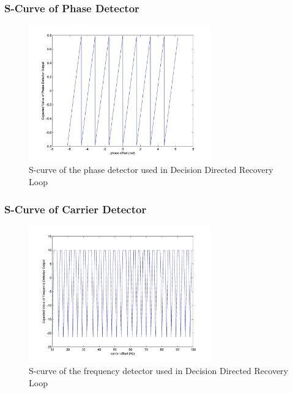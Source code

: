 \documentclass[]{article}
\begin{document}
\subsubsection{S-Curve of Phase Detector}
\begin{figure}[H]
\centering
\hspace*{-2cm}\includegraphics[width=0.7\textwidth]{qpScurvepo_ddr.jpg}
\caption{S-curve of the phase detector used in Decision Directed Recovery Loop \label{fig:ddrsphase}}
\end{figure}
\subsubsection{S-Curve of Carrier Detector}
\begin{figure}[H]
\centering
\hspace*{-2cm}\includegraphics[width=0.7\textwidth]{qpScurvefo.jpg}
\caption{S-curve of the frequency detector used in Decision Directed Recovery Loop \label{fig:ddrsfreq}}
\end{figure}
\end{document}
